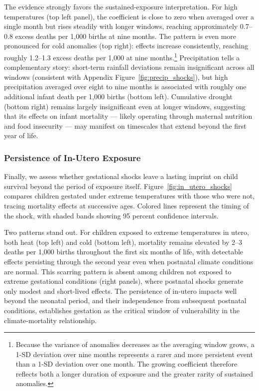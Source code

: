 \documentclass[a4paper]{article}
\begin{document}
The evidence strongly favors the sustained-exposure interpretation. For high temperatures (top left panel), the coefficient is close to zero when averaged over a single month but rises steadily with longer windows, reaching approximately 0.7--0.8 excess deaths per 1,000 births at nine months. The pattern is even more pronounced for cold anomalies (top right): effects increase consistently, reaching roughly 1.2--1.3 excess deaths per 1,000 at nine months.\footnote{Because the variance of anomalies decreases as the averaging window grows, a 1-SD deviation over nine months represents a rarer and more persistent event than a 1-SD deviation over one month. The growing coefficient therefore reflects both a longer duration of exposure and the greater rarity of sustained anomalies.} Precipitation tells a complementary story: short-term rainfall deviations remain insignificant across all windows (consistent with Appendix Figure~\ref{fig:precip_shocks}), but high precipitation averaged over eight to nine months is associated with roughly one additional infant death per 1,000 births (bottom left). Cumulative drought (bottom right) remains largely insignificant even at longer windows, suggesting that its effects on infant mortality — likely operating through maternal nutrition and food insecurity — may manifest on timescales that extend beyond the first year of life.

\subsubsection{Persistence of In-Utero Exposure}

Finally, we assess whether gestational shocks leave a lasting imprint on child survival beyond the period of exposure itself. Figure~\ref{fig:in_utero_shocks} compares children gestated under extreme temperatures with those who were not, tracing mortality effects at successive ages. Colored lines represent the timing of the shock, with shaded bands showing 95 percent confidence intervals.

Two patterns stand out. For children exposed to extreme temperatures in utero, both heat (top left) and cold (bottom left), mortality remains elevated by 2--3 deaths per 1,000 births throughout the first six months of life, with detectable effects persisting through the second year even when postnatal climate conditions are normal. This scarring pattern is absent among children not exposed to extreme gestational conditions (right panels), where postnatal shocks generate only modest and short-lived effects. The persistence of in-utero impacts well beyond the neonatal period, and their independence from subsequent postnatal conditions, establishes gestation as the critical window of vulnerability in the climate-mortality relationship.
\end{document}
